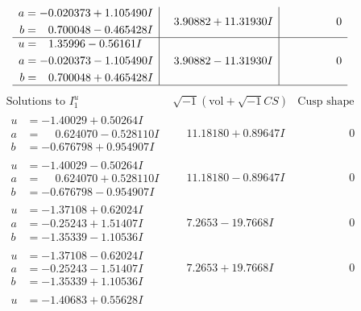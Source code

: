 \documentclass[1p]{elsarticle_modified}
\theoremstyle{definition}
\newcommand{\I}{\sqrt{-1}}
\begin{document}
$$\begin{array}{c|c|c}
\begin{aligned}
a &= -0.020373 + 1.105490 I \\
b &= \phantom{-}0.700048 - 0.465428 I\end{aligned}
 & \phantom{-}3.90882 + 11.31930 I & \phantom{-0.000000 } 0 \\ \hline\begin{aligned}
u &= \phantom{-}1.35996 - 0.56161 I \\
a &= -0.020373 - 1.105490 I \\
b &= \phantom{-}0.700048 + 0.465428 I\end{aligned}
 & \phantom{-}3.90882 - 11.31930 I & \phantom{-0.000000 } 0\\
 \hline 
 \end{array}$$\newpage$$\begin{array}{c|c|c}  
\text{Solutions to }I^u_{1}& \I (\text{vol} + \sqrt{-1}CS) & \text{Cusp shape}\\
 \hline 
\begin{aligned}
u &= -1.40029 + 0.50264 I \\
a &= \phantom{-}0.624070 - 0.528110 I \\
b &= -0.676798 + 0.954907 I\end{aligned}
 & \phantom{-}11.18180 + 0.89647 I & \phantom{-0.000000 } 0 \\ \hline\begin{aligned}
u &= -1.40029 - 0.50264 I \\
a &= \phantom{-}0.624070 + 0.528110 I \\
b &= -0.676798 - 0.954907 I\end{aligned}
 & \phantom{-}11.18180 - 0.89647 I & \phantom{-0.000000 } 0 \\ \hline\begin{aligned}
u &= -1.37108 + 0.62024 I \\
a &= -0.25243 + 1.51407 I \\
b &= -1.35339 - 1.10536 I\end{aligned}
 & \phantom{-}7.2653 - 19.7668 I & \phantom{-0.000000 } 0 \\ \hline\begin{aligned}
u &= -1.37108 - 0.62024 I \\
a &= -0.25243 - 1.51407 I \\
b &= -1.35339 + 1.10536 I\end{aligned}
 & \phantom{-}7.2653 + 19.7668 I & \phantom{-0.000000 } 0 \\ \hline\begin{aligned}
u &= -1.40683 + 0.55628 I \\

\end{aligned}
\end{array}$$
\end{document}
